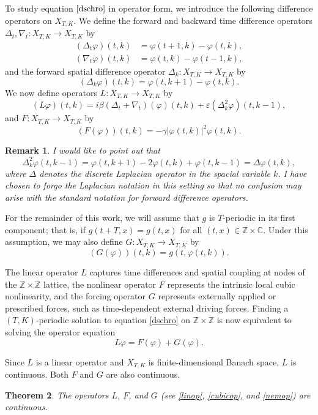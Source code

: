 \documentclass[10pt,a4paper]{amsart}
\newcommand{\C}{\mathbb{C}}
\newcommand{\Z}{\mathbb{Z}}
\newcommand{\be}{\begin{equation}}
\newcommand{\ee}{\end{equation}}
\newcommand{\bes}{\begin{equation*}}
\newcommand{\ees}{\end{equation*}}
\newcommand{\ve}{\varepsilon}
\renewcommand{\phi}{\varphi}
\numberwithin{equation}{section}
\newtheorem{theorem}{Theorem}[section]
\newtheorem{remark}[theorem]{\bf Remark}
\begin{document}
To study equation $\eqref{dschro}$ in operator form, we introduce the following difference operators on $X_{T,K}$. We define the forward and backward time difference operators $\Delta_t,\nabla_t : X_{T,K}\to X_{T,K}$ by
\be
\begin{aligned}
(\Delta_t \phi)(t,k) &= \phi(t+1,k)-\phi(t,k), \\
(\nabla_t \phi)(t,k) &= \phi(t,k)-\phi(t-1,k),
\end{aligned}
\ee
and the forward spatial difference operator $\Delta_k : X_{T,K}\to X_{T,K}$ by
\begin{equation}
(\Delta_k \phi)(t,k) = \phi(t,k+1)-\phi(t,k).
\end{equation}
We now define operators
 $L\colon X_{T,K}\to X_{T,K}$  by
\be\label{linop}
(L\phi)(t,k)=i\beta(\Delta_t+\nabla_t)(\phi)(t,k)+\ve(\Delta^2_k\phi)(t,k-1),
\ee
and
 $F\colon X_{T,K}\to X_{T,K}$  by
\be\label{cubicop}
(F(\phi))(t,k)=-\gamma|\phi(t,k)|^2\phi(t,k).
\ee
\begin{remark}
I would like to point out that
\bes
\Delta_k^2\phi(t,k-1)
=
\phi(t,k+1)-2\phi(t,k)+\phi(t,k-1)=\Delta\phi(t,k),
\ees
where $\Delta$ denotes the discrete Laplacian operator in the spacial variable $k$.  I have chosen to forgo the Laplacian notation in this setting so that no confusion may arise with the standard notation for forward difference operators.
\end{remark}

For the remainder of this work, we will assume that $g$ is $T$-periodic in its first component; that is, if $g(t+T,x)=g(t,x)$ for all $(t,x)\in \Z\times \C$.  Under this assumption, we may also define 
 $G\colon X_{T,K}\to X_{T,K}$  by
\be\label{nemop}
(G(\phi))(t,k)=g(t,\phi(t,k)).
\ee


The linear operator $L$ captures time differences and spatial coupling at nodes of the $\Z\times \Z$ lattice, the nonlinear operator 
$F$ represents the intrinsic local cubic nonlinearity, and the forcing operator $G$ represents externally applied or prescribed forces, such as time-dependent external driving forces. Finding a $(T,K)$-periodic solution to equation \eqref{dschro} on $\Z\times \Z$ is now equivalent to solving the operator equation 
\be\label{banschro}
L\phi=F(\phi)+G(\phi).
\ee


Since $L$ is a linear operator and $X_{T,K}$ is finite-dimensional Banach space,  $L$ is continuous.  Both $F$ and $G$ are also continuous.
\begin{theorem}
The operators $L$, $F$, and $G$ (see \eqref{linop}, \eqref{cubicop}, and \eqref{nemop}) are continuous. 
\end{theorem}
\end{document}
